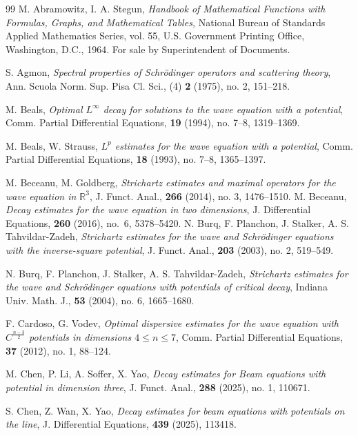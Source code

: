 \documentclass[reqno]{amsart}
\numberwithin{equation}{section}
\begin{document}
\begin{thebibliography}{99}
M. Abramowitz, I. A. Stegun,
\emph{Handbook of Mathematical Functions with Formulas, Graphs, and Mathematical Tables,}
National Bureau of Standards Applied Mathematics Series, vol. 55, U.S. Government
Printing Office, Washington, D.C., 1964. For sale by Superintendent of Documents.

S. Agmon, \emph{Spectral properties of Schr\"{o}dinger operators and
  scattering theory}, Ann. Scuola Norm. Sup. Pisa Cl. Sci., (4) \textbf{2} (1975), no. 2, 151--218.

M. Beals, \emph{Optimal $L^\infty$ decay for solutions to the wave equation with a potential},
 Comm. Partial Differential Equations, \textbf{19} (1994), no. 7--8, 1319--1369.

M. Beals, W. Strauss, \emph{$L^p$ estimates for the wave equation with a potential},
 Comm. Partial Differential Equations, \textbf{18} (1993), no. 7--8, 1365--1397.

M. Beceanu, M. Goldberg, \emph{Strichartz estimates and maximal operators  for the wave equation in $\mathbb{R}^3$},
J. Funct. Anal., \textbf{266} (2014), no. 3, 1476--1510.
M. Beceanu,
\emph{Decay estimates for the wave equation in two dimensions},
J. Differential Equations, \textbf{260} (2016), no.~6, 5378--5420.
N. Burq, F. Planchon, J. Stalker, A. S. Tahvildar-Zadeh,
\emph{Strichartz estimates for the wave and Schr\"{o}dinger equations with the inverse-square potential},
J. Funct. Anal., \textbf{203} (2003), no. 2, 519--549.

N. Burq, F. Planchon, J. Stalker, A. S. Tahvildar-Zadeh,
\emph{Strichartz estimates for the wave and Schr\"{o}dinger equations with potentials of critical decay},
Indiana Univ. Math. J., \textbf{53} (2004), no. 6, 1665--1680.

F. Cardoso, G. Vodev,
\emph{Optimal dispersive estimates for the wave equation with $C^{\frac{n-3}{2}}$ potentials in dimensions $4\leq n \leq 7$},
 Comm. Partial Differential Equations, \textbf{37} (2012), no. 1, 88--124.

 M. Chen, P. Li, A. Soffer, X. Yao, \emph{Decay estimates for Beam equations with potential in dimension three}, J. Funct. Anal., \textbf{288} (2025), no. 1, 110671.

S. Chen, Z. Wan, X. Yao, \emph{Decay estimates for beam equations with potentials on the line}, J. Differential Equations, \textbf{439} (2025), 113418.


\end{thebibliography}
\end{document}
